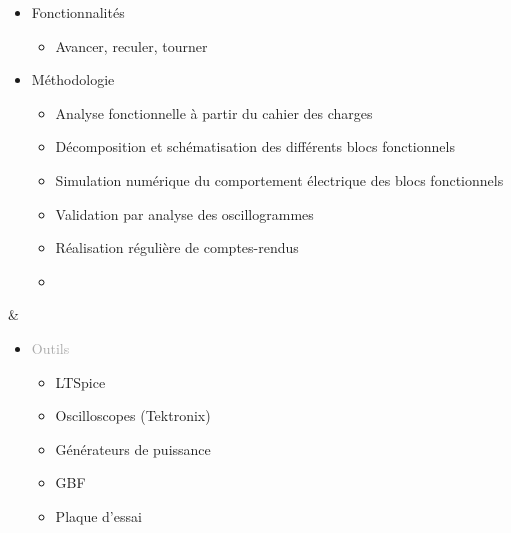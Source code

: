 \documentclass{article}
\begin{document}
\begin{tabular}
\begin{itemize}
\begin{itemize}
            \item \textcolor{gray!80}{Fonctionnalités}
            \begin{itemize}
                [label={\textcolor{gray!80}{$\triangleright$}}, topsep=0pt, partopsep=0pt, itemsep=0.5pt, parsep=2pt]
                \item \textcolor{gray!80}{Avancer, reculer, tourner}
            \end{itemize}
            \item \textcolor{gray!80}{Méthodologie}       
            \begin{itemize}
                [label={\textcolor{gray!80}{$\triangleright$}}, topsep=0pt, partopsep=0pt, itemsep=0.5pt, parsep=2pt]
                \item \textcolor{gray!80}{Analyse fonctionnelle à partir du cahier des charges}
                \item \textcolor{gray!80}{Décomposition et schématisation des différents blocs fonctionnels}
                \item \textcolor{gray!80}{Simulation numérique du comportement électrique des blocs fonctionnels}
                \item \textcolor{gray!80}{Validation par analyse des oscillogrammes}  
                \item \textcolor{gray!80}{Réalisation régulière de comptes-rendus}
                \item[\textcolor{white}{}] {} %
            \end{itemize}
        \end{itemize}
    \end{itemize}
    &
    \begin{itemize}
        [label={}, topsep=8pt, partopsep=0pt, itemsep=0.5pt, parsep=2pt]
        \setlength{\itemsep}{10pt}
        \item \textcolor{darkGray}{Outils}
        \begin{itemize}
        [label={\textcolor{gray!80}{\checkmark}}, topsep=8pt, partopsep=0pt, itemsep=0.5pt, parsep=2pt] 
            
            \item \textcolor{gray!80}{LTSpice}
            \item \textcolor{gray!80}{Oscilloscopes (Tektronix)}
            \item \textcolor{gray!80}{Générateurs de puissance}
            \item \textcolor{gray!80}{GBF}
            \item \textcolor{gray!80}{Plaque d'essai}


\end{itemize}
\end{itemize}
\end{tabular}
\end{document}
